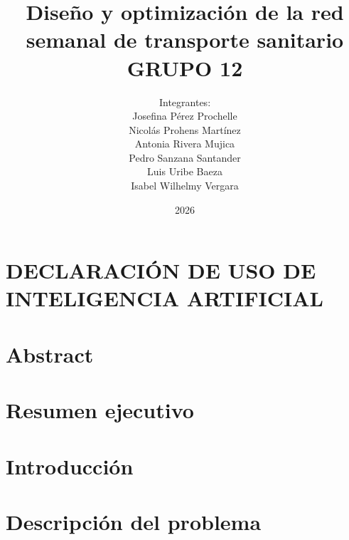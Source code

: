 \documentclass[pdftex]{pucthesis}
\begin{document}
\title[Diseño y optimización de la red semanal de transporte sanitario\\ GRUPO 12]
   {\bf Diseño y optimización de la red semanal de transporte sanitario\\ GRUPO 12}
\author[Integrantes:]{Integrantes:\\
\textnormal{\small{
Josefina Pérez Prochelle\\
Nicolás Prohens Martínez\\
Antonia Rivera Mujica\\
Pedro Sanzana Santander\\
Luis Uribe Baeza\\
Isabel Wilhelmy Vergara}}}
\address{Escuela de Ingenier\'ia\\ Pontificia Universidad Cat\'olica de Chile}
\date{2026}

\NoChapterPageNumber
{}
\maketitle

\chapter*{DECLARACIÓN DE USO DE INTELIGENCIA ARTIFICIAL}

\cleardoublepage

\tableofcontents
\cleardoublepage


\chapter[ABSTRACT]{Abstract}


\chapter[RESUMEN EJECUTIVO]{Resumen ejecutivo}\label{cap:resumen}


\chapter[INTRODUCCIÓN]{Introducción}


\chapter[DESCRIPCIÓN DEL PROBLEMA]{Descripción del problema}\label{cap:descripcion}

\end{document}
